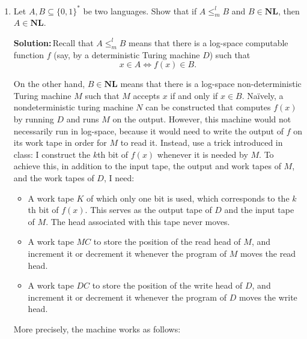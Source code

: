 \documentclass{amsart}
\theoremstyle{plain}
\theoremstyle{definition}
\newcommand{\nl}{\textbf{NL}}
\newcommand{\sol}{\textbf{Solution:\,}}
\begin{document}
\begin{enumerate}[label=\textbf{Exercise \arabic*:}, leftmargin=0cm, labelwidth=-0.2cm, align=left]
        \item
            Let $A, B \subseteq \{0, 1\}^*$ be two languages.
            Show that if $A \leq_m^l B$ and $B \in \nl$, then $A \in \nl$.

            \sol Recall that $A \leq_m^l B$ means that there is a log-space computable function $f$
            (say, by a deterministic Turing machine $D$) such that
            \begin{equation}
                x \in A \iff f(x) \in B.
                \label{eq:logspace}
            \end{equation}

            On the other hand, $B \in \nl$ means that there is a log-space non-deterministic Turing machine $M$
            such that $M$ accepts $x$ if and only if $x \in B$.
            Naïvely, a nondeterministic turing machine $N$ can be constructed that computes $f(x)$ by running $D$ and runs $M$ on the output.
            However, this machine would not necessarily run in log-space, because it would need to write the output of $f$ on its
            work tape in order for $M$ to read it.
            Instead, use a trick introduced in class: I construct the $k$th bit of $f(x)$ whenever it is needed by $M$.
            To achieve this, in addition to the input tape, the output and work tapes of  $M$, and the work tapes of $D$, I need:
            \begin{itemize}
                \item A work tape $K$ of which only one bit is used, which corresponds to the $k$th bit of $f(x)$.
                This serves as the output tape of $D$ and the input tape of $M$.
                The head associated with this tape never moves.

                \item A work tape $MC$ to store the position of the read head of $M$, and increment it or decrement it
                whenever the program of $M$ moves the read head.

                \item A work tape $DC$ to store the position of the write head of $D$, and increment it or decrement it
                whenever the program of $D$ moves the write head.
            \end{itemize}

            More precisely, the machine works as follows:


\end{enumerate}
\end{document}

